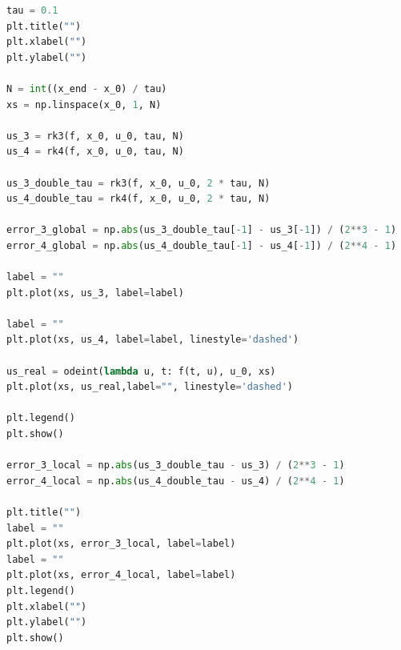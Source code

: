 \documentclass[11pt]{article}
\begin{document}
\begin{lstlisting}[language=Python]
tau = 0.1
plt.title("")
plt.xlabel("")
plt.ylabel("")

N = int((x_end - x_0) / tau)
xs = np.linspace(x_0, 1, N)

us_3 = rk3(f, x_0, u_0, tau, N)
us_4 = rk4(f, x_0, u_0, tau, N)

us_3_double_tau = rk3(f, x_0, u_0, 2 * tau, N)
us_4_double_tau = rk4(f, x_0, u_0, 2 * tau, N)

error_3_global = np.abs(us_3_double_tau[-1] - us_3[-1]) / (2**3 - 1)
error_4_global = np.abs(us_4_double_tau[-1] - us_4[-1]) / (2**4 - 1)

label = ""
plt.plot(xs, us_3, label=label)

label = ""
plt.plot(xs, us_4, label=label, linestyle='dashed')
    
us_real = odeint(lambda u, t: f(t, u), u_0, xs)
plt.plot(xs, us_real,label="", linestyle='dashed')

plt.legend()
plt.show()
    
error_3_local = np.abs(us_3_double_tau - us_3) / (2**3 - 1)
error_4_local = np.abs(us_4_double_tau - us_4) / (2**4 - 1)

plt.title("")
label = ""
plt.plot(xs, error_3_local, label=label)
label = ""
plt.plot(xs, error_4_local, label=label)
plt.legend()
plt.xlabel("")
plt.ylabel("")
plt.show()
\end{lstlisting}
\end{document}
